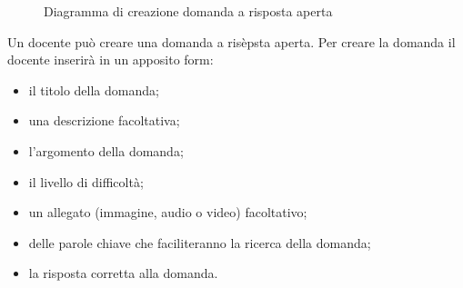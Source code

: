 \documentclass[a4paper, titlepage]{article}
\begin{document}
\newpage
{}
\begin{figure}[H]
	\centering
	\noindent{}
	\caption{Diagramma di creazione domanda a risposta aperta}
\end{figure}
Un docente può creare una domanda a risèpsta aperta. Per creare la domanda il docente inserirà in un apposito form:
\begin{itemize}
	\item il titolo della domanda;
	\item una descrizione facoltativa;
	\item l'argomento della domanda;
	\item il livello di difficoltà;
	\item un allegato (immagine, audio o video) facoltativo;
	\item delle parole chiave che faciliteranno la ricerca della domanda;
	\item la risposta corretta alla domanda.
\end{itemize}
\end{document}
